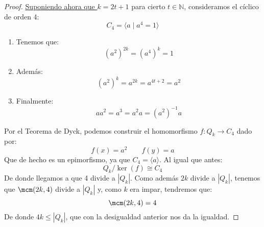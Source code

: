 \begin{ejemplo}
\begin{itemize}
\begin{proof}
                \noindent
                \underline{Suponiendo ahora que $k = 2t+1$} para cierto $t\in \mathbb{N}$, consideramos el cíclico de orden 4:
                \begin{equation*}
                    C_4 = \langle a \mid a^4 = 1 \rangle 
                \end{equation*}
                \begin{enumerate}
                    \item Tenemos que:
                        \begin{equation*}
                            {(a^{2})}^{2k} = {(a^4)}^{k} = 1
                        \end{equation*}
                    \item Además:
                        \begin{equation*}
                            {(a^{2})}^{k} = a^{2k} = a^{4t+2} = a^2
                        \end{equation*}
                    \item Finalmente:
                        \begin{equation*}
                            aa^2 = a^3 = a^2 a = {(a^{2})}^{-1}a
                        \end{equation*}
                \end{enumerate}
                Por el Teorema de Dyck, podemos construir el homomorfismo $f:Q_k\to C_4$ dado por:
                \begin{equation*}
                    f(x) = a^2 \qquad f(y) = a
                \end{equation*}
                Que de hecho es un epimorfismo, ya que $C_4 = \langle a \rangle $. Al igual que antes:
                \begin{equation*}
                    Q_k/\ker(f) \cong C_4
                \end{equation*}
                De donde llegamos a que 4 divide a $|Q_k|$. Como además $2k$ divide a $|Q_k|$, tenemos que $\mcm(2k,4)$ divide a $|Q_k|$ y, como $k$ era impar, tendremos que:
                \begin{equation*}
                    \mcm(2k,4) = 4
                \end{equation*}
                De donde $4k\leq |Q_k|$, que con la desigualdad anterior nos da la igualdad.
            \end{proof}
    \end{itemize}
\end{ejemplo}

